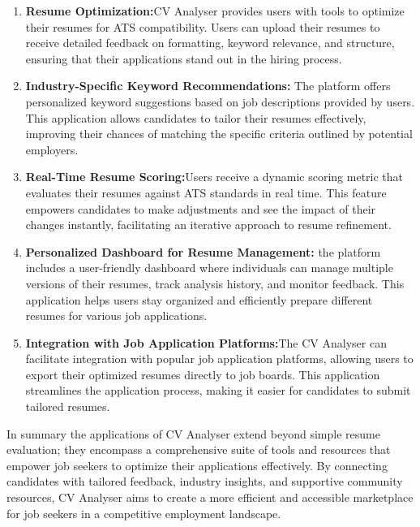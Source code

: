 \documentclass[12pt,a4paper]{report}
\begin{document}
\begin{enumerate}
    \item \textbf{ Resume Optimization:}CV Analyser provides users with tools to optimize their resumes for ATS compatibility. Users can upload their resumes to receive detailed feedback on formatting, keyword relevance, and structure, ensuring that their applications stand out in the hiring process.

    \item \textbf{ Industry-Specific Keyword Recommendations:} The platform offers personalized keyword suggestions based on job descriptions provided by users. This application allows candidates to tailor their resumes effectively, improving their chances of matching the specific criteria outlined by potential employers.

    \item \textbf{Real-Time Resume Scoring:}Users receive a dynamic scoring metric that evaluates their resumes against ATS standards in real time. This feature empowers candidates to make adjustments and see the impact of their changes instantly, facilitating an iterative approach to resume refinement.
    \item \textbf{Personalized Dashboard for Resume Management:} the platform includes a user-friendly dashboard where individuals can manage multiple versions of their resumes, track analysis history, and monitor feedback. This application helps users stay organized and efficiently prepare different resumes for various job applications.

    \item \textbf{ Integration with Job Application Platforms:}The CV Analyser can facilitate integration with popular job application platforms, allowing users to export their optimized resumes directly to job boards. This application streamlines the application process, making it easier for candidates to submit tailored resumes.\\
  
   
\end{enumerate}
In summary the applications of CV Analyser extend beyond simple resume evaluation; they encompass a comprehensive suite of tools and resources that empower job seekers to optimize their applications effectively. By connecting candidates with tailored feedback, industry insights, and supportive community resources, CV Analyser aims to create a more efficient and accessible marketplace for job seekers in a competitive employment landscape.
\end{document}
